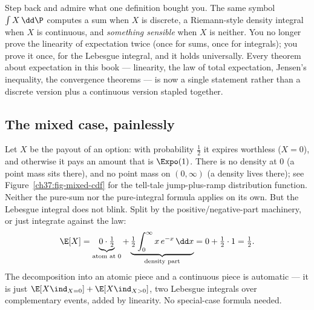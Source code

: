 \begin{aestheticbox}
Step back and admire what one definition bought you. The same symbol
$\int X\,\dd\P$ computes a sum when $X$ is discrete, a Riemann-style density
integral when $X$ is continuous, and \emph{something sensible} when $X$ is
neither. You no longer prove the linearity of expectation twice (once for sums,
once for integrals); you prove it once, for the Lebesgue integral, and it holds
universally. Every theorem about expectation in this book --- linearity, the law
of total expectation, Jensen's inequality, the convergence theorems --- is now a
single statement rather than a discrete version plus a continuous version
stapled together.
\end{aestheticbox}

\subsection{The mixed case, painlessly}

\begin{example}
\label{ch37:mixed}
Let $X$ be the payout of an option: with probability $\tfrac12$ it expires
worthless ($X=0$), and otherwise it pays an amount that is $\Expo(1)$. There is
no density at $0$ (a point mass sits there), and no point mass on $(0,\infty)$
(a density lives there); see Figure~\ref{ch37:fig-mixed-cdf} for the tell-tale
jump-plus-ramp distribution function. Neither the pure-sum nor the pure-integral
formula applies on its own. But the Lebesgue integral does not blink. Split by the
positive/negative-part machinery, or just integrate against the law:
\[
  \E[X] = \underbrace{0\cdot \tfrac12}_{\text{atom at }0}
        + \underbrace{\tfrac12\int_0^\infty x\,e^{-x}\,\dd x}_{\text{density part}}
        = 0 + \tfrac12\cdot 1 = \tfrac12 .
\]
The decomposition into an atomic piece and a continuous piece is automatic ---
it is just $\E[X\ind_{X=0}] + \E[X\ind_{X>0}]$, two Lebesgue integrals over
complementary events, added by linearity. No special-case formula needed.
\end{example}

